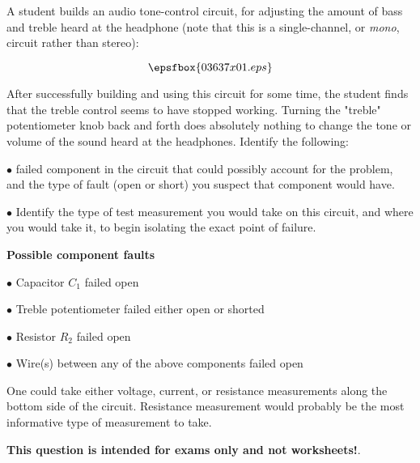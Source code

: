 

A student builds an audio tone-control circuit, for adjusting the amount of bass and treble heard at the headphone (note that this is a single-channel, or {\it mono}, circuit rather than stereo):

$$\epsfbox{03637x01.eps}$$

After successfully building and using this circuit for some time, the student finds that the treble control seems to have stopped working.  Turning the "treble" potentiometer knob back and forth does absolutely nothing to change the tone or volume of the sound heard at the headphones.  Identify the following:

\vskip 10pt

\medskip
\item{$\bullet$}  failed component in the circuit that could possibly account for the problem, and the type of fault (open or short) you suspect that component would have.
\vskip 40pt
\item{$\bullet$} Identify the type of test measurement you would take on this circuit, and where you would take it, to begin isolating the exact point of failure.
\medskip







\noindent
{\bf Possible component faults}

\medskip
\item{$\bullet$} Capacitor $C_1$ failed open
\item{$\bullet$} Treble potentiometer failed either open or shorted
\item{$\bullet$} Resistor $R_2$ failed open
\item{$\bullet$} Wire(s) between any of the above components failed open
\medskip

One could take either voltage, current, or resistance measurements along the bottom side of the circuit.  Resistance measurement would probably be the most informative type of measurement to take.







{\bf This question is intended for exams only and not worksheets!}.



